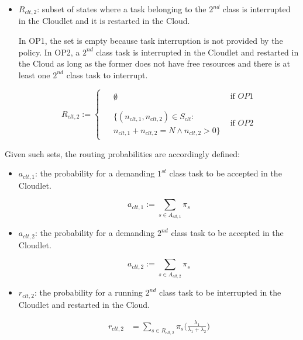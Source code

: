 \begin{itemize}
	\item $R_{clt,2}$: subset of states where  a task belonging to the $2^{nd}$ class is interrupted in the Cloudlet and it is restarted in the Cloud.
	
	In OP1, the set is empty because task interruption is not provided by the policy.
	In OP2, a $2^{nd}$ class task is interrupted in the Cloudlet and restarted in the Cloud as long as the former does not have free resources and there is at least one $2^{nd}$ class task to interrupt.
	
	\begin{equation}
		R_{clt,2} :=
		\left\{
		\begin{array}{ll}
			\begin{aligned}
				& \emptyset
			\end{aligned} & \mbox{if } OP1 \\
			\\
			\begin{aligned}
				& \{(n_{clt,1},n_{clt,2})\in S_{clt} : \\
				& n_{clt,1}+n_{clt,2}=N \wedge n_{clt,2}>0\}
			\end{aligned} & \mbox{if } OP2
		\end{array}
		\right.
	\end{equation}
\end{itemize}

Given such sets, the routing probabilities  are accordingly defined:

\begin{itemize}
	
	\item $a_{clt,1}$: the probability for a demanding $1^{st}$ class task to be accepted in the Cloudlet.
	
	\begin{equation} 
		a_{clt,1} := \sum_{s\in A_{clt,1}} \pi_{s}
	\end{equation}
	
	\item $a_{clt,2}$: the probability for a demanding $2^{nd}$ class task to be accepted in the Cloudlet.
	
	\begin{equation} 
		a_{clt,2} := \sum_{s\in A_{clt,2}} \pi_{s}
	\end{equation}
		
	\item $r_{clt,2}$: the probability for a running $2^{nd}$ class task to be interrupted in the Cloudlet and restarted in the Cloud.
	
	\begin{equation} 
		\begin{split}
			r_{clt,2} & = \sum_{s\in R_{clt,2}} \pi_{s} \Big(\frac{\lambda_{1}}{\lambda_{1}+\lambda_{2}}\Big) \\
		\end{split}
	\end{equation}
\end{itemize}

